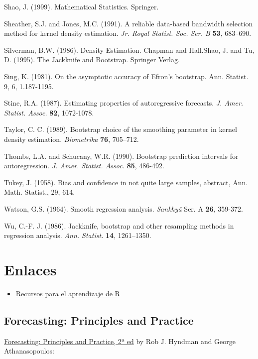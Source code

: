 \documentclass[]{book}
\providecommand{\tightlist}{%
  \setlength{\itemsep}{0pt}\setlength{\parskip}{0pt}}
\theoremstyle{definition}
\theoremstyle{definition}
\theoremstyle{definition}
\theoremstyle{remark}
\begin{document}
Shao, J. (1999). Mathematical Statistics. Springer.

Sheather, S.J. and Jones, M.C. (1991). A reliable data-based bandwidth
selection method for kernel density estimation. \emph{Jr. Royal Statist.
Soc. Ser. B} \textbf{53}, 683--690.

Silverman, B.W. (1986). Density Estimation. Chapman and Hall.Shao, J.
and Tu, D. (1995). The Jackknife and Bootstrap. Springer Verlag.

Sing, K. (1981). On the asymptotic accuracy of Efron's bootstrap. Ann.
Statist. 9, 6, 1.187-1195.

Stine, R.A. (1987). Estimating properties of autoregressive forecasts.
\emph{J. Amer. Statist. Assoc.} \textbf{82}, 1072-1078.

Taylor, C. C. (1989). Bootstrap choice of the smoothing parameter in
kernel density estimation. \emph{Biometrika} \textbf{76}, 705--712.

Thombs, L.A. and Schucany, W.R. (1990). Bootstrap prediction intervals
for autoregression. \emph{J. Amer. Statist. Assoc.} \textbf{85},
486-492.

Tukey, J. (1958). Bias and confidence in not quite large samples,
abstract, Ann. Math. Statist., 29, 614.

Watson, G.S. (1964). Smooth regression analysis. \emph{Sankhy{ā}} Ser. A
\textbf{26}, 359-372.

Wu, C.-F. J. (1986). Jackknife, bootstrap and other resampling methods
in regression analysis. \emph{Ann. Statist.} \textbf{14}, 1261--1350.

\section{Enlaces}\label{enlaces}

\begin{itemize}
\tightlist
\item
  \href{https://rubenfcasal.github.io/post/ayuda-y-recursos-para-el-aprendizaje-de-r}{Recursos
  para el aprendizaje de R}
\end{itemize}

\subsection{Forecasting: Principles and Practice}\label{forecast-links}

\href{https://otexts.com/fpp2}{Forecasting: Principles and Practice, 2ª
ed} by Rob J. Hyndman and George Athanasopoulos:
\end{document}
